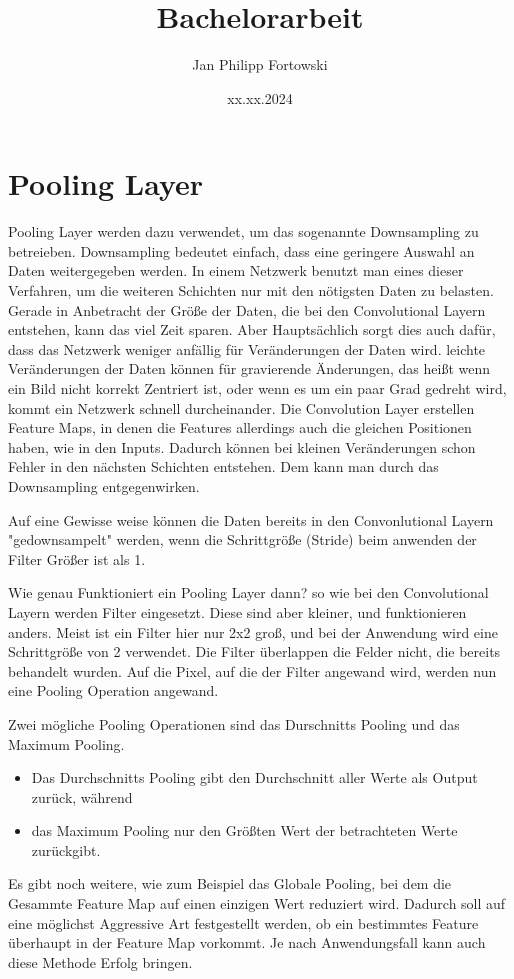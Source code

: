 \documentclass[12pt]{article}
\title{\textbf{Bachelorarbeit}}
\author{Jan Philipp Fortowski}
\date{xx.xx.2024}
\begin{document}
\maketitle
\cleardoublepage
\tableofcontents
\cleardoublepage
\thispagestyle{empty}



\section{Pooling Layer}
Pooling Layer werden dazu verwendet, um das sogenannte Downsampling zu betreieben. Downsampling bedeutet einfach, dass eine geringere Auswahl an Daten weitergegeben werden.
In einem Netzwerk benutzt man eines dieser Verfahren, um die weiteren Schichten nur mit den nötigsten Daten zu belasten. Gerade in Anbetracht der Größe der Daten, die bei den Convolutional Layern entstehen, kann das viel Zeit sparen. Aber Hauptsächlich sorgt dies auch dafür, dass das Netzwerk weniger anfällig für Veränderungen der Daten wird. leichte Veränderungen der Daten können für gravierende Änderungen, das heißt wenn ein Bild nicht korrekt Zentriert ist, oder wenn es um ein paar Grad gedreht wird, kommt ein Netzwerk schnell durcheinander.
Die Convolution Layer erstellen Feature Maps, in denen die Features allerdings auch die gleichen Positionen haben, wie in den Inputs. Dadurch können bei kleinen Veränderungen schon Fehler in den nächsten Schichten entstehen. Dem kann man durch das Downsampling entgegenwirken.

Auf eine Gewisse weise können die Daten bereits in den Convonlutional Layern "gedownsampelt" werden, wenn die Schrittgröße (Stride) beim anwenden der Filter Größer ist als 1.

Wie genau Funktioniert ein Pooling Layer dann? so wie bei den Convolutional Layern werden Filter eingesetzt. Diese sind aber kleiner, und funktionieren anders. Meist ist ein Filter hier nur 2x2 groß, und bei der Anwendung wird eine Schrittgröße von 2 verwendet. Die Filter überlappen die Felder nicht, die bereits behandelt wurden. 
Auf die Pixel, auf die der Filter angewand wird, werden nun eine Pooling Operation angewand. 

Zwei mögliche Pooling Operationen sind das Durschnitts Pooling und das Maximum Pooling. 
\begin{itemize}
  \item Das Durchschnitts Pooling gibt den Durchschnitt aller Werte als Output zurück, während
  \item das Maximum Pooling nur den Größten Wert der betrachteten Werte zurückgibt.
\end{itemize}
Es gibt noch weitere, wie zum Beispiel das Globale Pooling, bei dem die Gesammte Feature Map auf einen einzigen Wert reduziert wird. Dadurch soll auf eine möglichst Aggressive Art festgestellt werden, ob ein bestimmtes Feature überhaupt in der Feature Map vorkommt. Je nach Anwendungsfall kann auch diese Methode Erfolg bringen.
\end{document}
